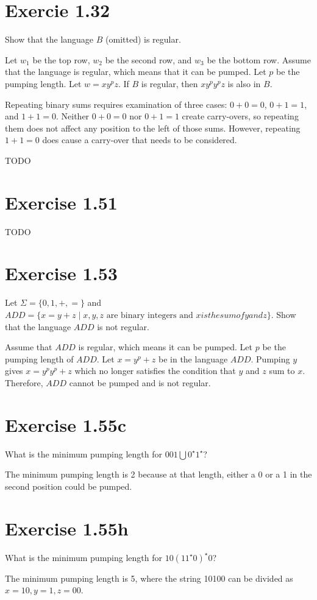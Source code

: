 \documentclass{article}
\newcommand{\union}{\bigcup}
\newcommand{\where}{\mid}
\begin{document}
\section{Exercie 1.32}

Show that the language $B$ (omitted) is regular.

Let $w_1$ be the top row, $w_2$ be the second row, and $w_3$ be the bottom row.
Assume that the language is regular, which means that it can be pumped. Let
$p$ be the pumping length. Let $w = xy^pz$. If $B$ is regular, then $xy^py^pz$
is also in $B$.

Repeating binary sums requires examination of three cases: $0 + 0 = 0$, $0 + 1
= 1$, and $1 + 1 = 0$. Neither $0 + 0 = 0$ nor $0 + 1 = 1$ create carry-overs,
so repeating them does not affect any position to the left of those sums.
However, repeating $1 + 1 = 0$ does cause a carry-over that needs to be
considered.

TODO

\section{Exercise 1.51}

TODO

\section{Exercise 1.53}

Let $\Sigma = \{0, 1, +, =\}$ and $ADD = \{ x=y+z \where x, y, z \text{ are
binary integers and } x { is the sum of } y { and } z\}$. Show that the language
$ADD$ is not regular.

Assume that $ADD$ is regular, which means it can be pumped. Let $p$ be the
pumping length of $ADD$. Let $x=y^p + z$ be in the language $ADD$. Pumping $y$
gives $x = y^p y^p + z$ which no longer satisfies the condition that $y$ and $z$
sum to $x$. Therefore, $ADD$ cannot be pumped and is not regular.

\section{Exercise 1.55c}

What is the minimum pumping length for $001 \union 0^\star1^\star$?

The minimum pumping length is 2 because at that length, either a 0 or a 1
in the second position could be pumped. 

\section{Exercise 1.55h}

What is the minimum pumping length for $10(11^\star0)^\star0$?

The minimum pumping length is 5, where the string 10100 can be divided as $x
= 10, y = 1, z = 00$.
\end{document}
